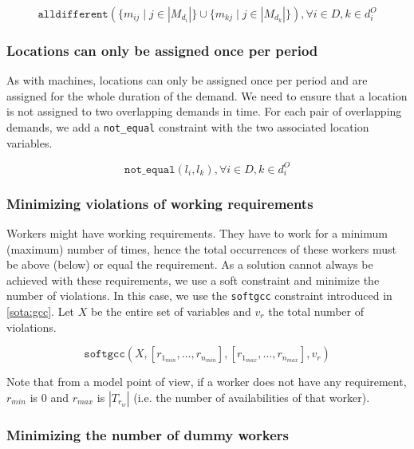 \documentclass[../../thesis.tex]{subfiles}
\begin{document}
\begin{equation}
  \label{}
  \texttt{alldifferent}(\{ m_{ij} \mid j \in |M_{d_i}| \} \cup \{ m_{kj} \mid j \in |M_{d_k}| \}), \forall i \in D, k \in d^O_i
\end{equation}

\subsubsection{Locations can only be assigned once per period}

As with machines, locations can only be assigned once per period and are assigned for the whole duration of the demand. We need 
to ensure that a location is not assigned to two overlapping demands in time. For each pair of overlapping demands,
we add a \texttt{not_equal} constraint with the two associated location variables.

\begin{equation}
  \label{}
  \texttt{not_equal}(l_{i}, l_{k}), \forall i \in D, k \in d^O_i
\end{equation}


\subsubsection{Minimizing violations of working requirements}

Workers might have working requirements. They have to work for a minimum (maximum) number of times, hence the total 
occurrences of these workers must be above (below) or equal the requirement. As a solution cannot always be 
achieved with these requirements, we use a soft constraint and minimize the number of violations. In this case,
we use the \texttt{softgcc} constraint introduced in \autoref{sota:gcc}. Let $X$ be the entire set of variables and 
$v_r$ the total number of violations.

\begin{equation}
  \texttt{softgcc}(X, [r_{1_{min}}, \dots, r_{n_{min}}], [r_{1_{max}}, \dots, r_{n_{max}}], v_{r}) \label{cp:wrequirements} 
\end{equation}

Note that from a model point of view, if a worker does not have any requirement, $r_{min}$ is 0 and $r_{max}$ is $|T_{r_w}| $ (i.e. the number of availabilities of that worker).


\subsubsection{Minimizing the number of dummy workers}
\end{document}
